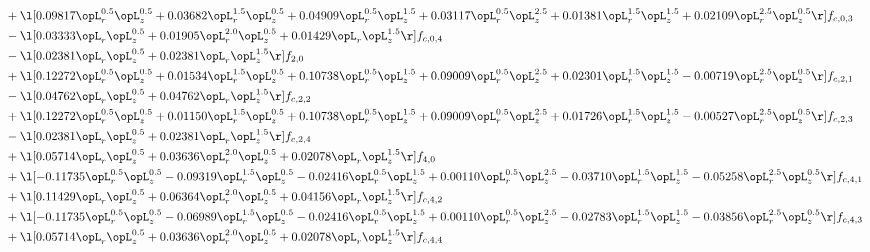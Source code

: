 \begin{alignat}{2}
& + \l[  0.09817 \opL_r^{0.5} \opL_z^{0.5} +  0.03682 \opL_r^{1.5} \opL_z^{0.5} +  0.04909 \opL_r^{0.5} \opL_z^{1.5} +  0.03117 \opL_r^{0.5} \opL_z^{2.5} +  0.01381 \opL_r^{1.5} \opL_z^{1.5} +  0.02109 \opL_r^{2.5} \opL_z^{0.5}  \r] f_{c,0,3} \nonumber \\ 
& - \l[  0.03333 \opL_r \opL_z^{0.5} +  0.01905 \opL_r^{2.0} \opL_z^{0.5} +  0.01429 \opL_r \opL_z^{1.5}  \r] f_{c,0,4} \nonumber \\ 
& - \l[  0.02381 \opL_r \opL_z^{0.5} +  0.02381 \opL_r \opL_z^{1.5}  \r] f_{2,0} \nonumber \\ 
& + \l[  0.12272 \opL_r^{0.5} \opL_z^{0.5} +  0.01534 \opL_r^{1.5} \opL_z^{0.5} +  0.10738 \opL_r^{0.5} \opL_z^{1.5} +  0.09009 \opL_r^{0.5} \opL_z^{2.5} +  0.02301 \opL_r^{1.5} \opL_z^{1.5}   -0.00719 \opL_r^{2.5} \opL_z^{0.5}  \r] f_{c,2,1} \nonumber \\ 
& - \l[  0.04762 \opL_r \opL_z^{0.5} +  0.04762 \opL_r \opL_z^{1.5}  \r] f_{c,2,2} \nonumber \\ 
& + \l[  0.12272 \opL_r^{0.5} \opL_z^{0.5} +  0.01150 \opL_r^{1.5} \opL_z^{0.5} +  0.10738 \opL_r^{0.5} \opL_z^{1.5} +  0.09009 \opL_r^{0.5} \opL_z^{2.5} +  0.01726 \opL_r^{1.5} \opL_z^{1.5}   -0.00527 \opL_r^{2.5} \opL_z^{0.5}  \r] f_{c,2,3} \nonumber \\ 
& - \l[  0.02381 \opL_r \opL_z^{0.5} +  0.02381 \opL_r \opL_z^{1.5}  \r] f_{c,2,4} \nonumber \\ 
& + \l[  0.05714 \opL_r \opL_z^{0.5} +  0.03636 \opL_r^{2.0} \opL_z^{0.5} +  0.02078 \opL_r \opL_z^{1.5}  \r] f_{4,0} \nonumber \\ 
& + \l[  -0.11735 \opL_r^{0.5} \opL_z^{0.5}   -0.09319 \opL_r^{1.5} \opL_z^{0.5}   -0.02416 \opL_r^{0.5} \opL_z^{1.5} +  0.00110 \opL_r^{0.5} \opL_z^{2.5}   -0.03710 \opL_r^{1.5} \opL_z^{1.5}   -0.05258 \opL_r^{2.5} \opL_z^{0.5}  \r] f_{c,4,1} \nonumber \\ 
& + \l[  0.11429 \opL_r \opL_z^{0.5} +  0.06364 \opL_r^{2.0} \opL_z^{0.5} +  0.04156 \opL_r \opL_z^{1.5}  \r] f_{c,4,2} \nonumber \\ 
& + \l[  -0.11735 \opL_r^{0.5} \opL_z^{0.5}   -0.06989 \opL_r^{1.5} \opL_z^{0.5}   -0.02416 \opL_r^{0.5} \opL_z^{1.5} +  0.00110 \opL_r^{0.5} \opL_z^{2.5}   -0.02783 \opL_r^{1.5} \opL_z^{1.5}   -0.03856 \opL_r^{2.5} \opL_z^{0.5}  \r] f_{c,4,3} \nonumber \\ 
& + \l[  0.05714 \opL_r \opL_z^{0.5} +  0.03636 \opL_r^{2.0} \opL_z^{0.5} +  0.02078 \opL_r \opL_z^{1.5}  \r] f_{c,4,4} \nonumber \\ 
\end{alignat} 


